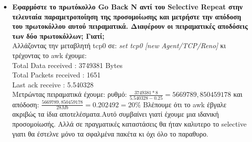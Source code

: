\documentclass{article}
\begin{document}
\begin{itemize}
{				αυτή ζεύξη τόσο θεωρητικά, όσο και πειραματικά. Αιτιολογείστε τυχόν αποκλίσεις που
				παρατηρούνται. }\\ 
			Αλλάζοντας τον κόδικα στα εξής σημεία:\\
			\textit{\$ns duplex-link \$n(0) \$n(1) 28Mb 200ms DropTail\\
				\$tcp0 set window\_ 127\\
			\$tcp0 set windowInit\_ 127}\\
		Κι τρέχοντας το awk έχουμε:\\
		Total Data received	: 3749381 Bytes\\
			Total Packets received	: 1651\\
			Last ack receive	: 5.540328\\
			
			
			Θεωρητικά η απόδοση είναι(χρησιμοποιόντας τους ίδιους τύπου πάλι):(αλλάζει μόνο το S=400,648)η=$\frac{W*TRANSP}{S}=293*0.274/(S-80+400)=0,200=20\%$ Πειραματικά έχουμε: ${3749381*8}{5.540328-0.25}=5669789,850459178 $ , αρα η$=\frac{2064287,033233581}{28Mb}=0.202492=20 \%$ Πολύ κοντά στην τυπμή
			\item \textbf{Εφαρμόστε το πρωτόκολλο Go Back N αντί του Selective Repeat στην τελευταία παραμετροποίηση
				της προσομοίωσης και μετρήστε την απόδοση του πρωτοκόλλου αυτού πειραματικά. Διαφέρουν οι
				πειραματικές αποδόσεις των δύο πρωτοκόλλων; Γιατί; }\\
			Αλλάζοντας την μεταβλητή tcp0 σε:\textit{ set tcp0 [new Agent/TCP/Reno]} κι τρέχοντας το awk έχουμε:\\
			Total Data received	: 3749381 Bytes\\
			Total Packets received	: 1651\\
			Last ack receive	: 5.540328\\
			Μετρώντας πειραματικά έχουμε: ρυθμό: $\frac{3749381*8}{5.540328-0.25}=5669789,850459178 $ και απόδοση: $\frac{5669789,850459178}{28Mb}=0.202492=20 \%$
			Βλέπουμε ότι το awk έβγαλε ακριβώς τα ίδια αποτελέσματα.Αυτό συμβαίνει γιατί έχουμε μια ιδανική προσομοίωσής. Αλλά σε πραγματικές καταστάσεις θα ήταν καλυτερο το selective γιατι θα έστελνε μόνο τα σφαλμένα πακέτα κι όχι όλο το παραθυρο.
		
		
	\end{itemize}
	
\end{document}
